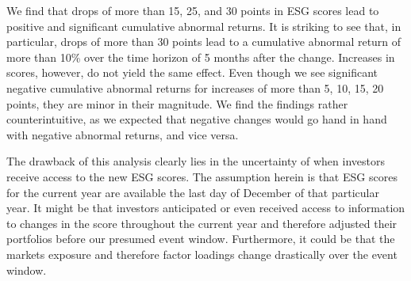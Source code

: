 \documentclass[11pt]{article}
\begin{document}
We find that drops of more than 15, 25, and 30 points in ESG scores lead to positive and significant cumulative abnormal returns. It is striking to see that, in particular, drops of more than 30 points lead to a cumulative abnormal return of more than 10\% over the time horizon of 5 months after the change. Increases in scores, however, do not yield the same effect. Even though we see significant negative cumulative abnormal returns for increases of more than 5, 10, 15, 20 points, they are minor in their magnitude. We find the findings rather counterintuitive, as we expected that negative changes would go hand in hand with negative abnormal returns, and vice versa. 

The drawback of this analysis clearly lies in the uncertainty of when investors receive access to the new ESG scores. The assumption herein is that ESG scores for the current year are available the last day of December of that particular year. It might be that investors anticipated or even received access to information to changes in the score throughout the current year and therefore adjusted their portfolios before our presumed event window. Furthermore, it could be that the markets exposure and therefore factor loadings change drastically over the event window. 
\end{document}
